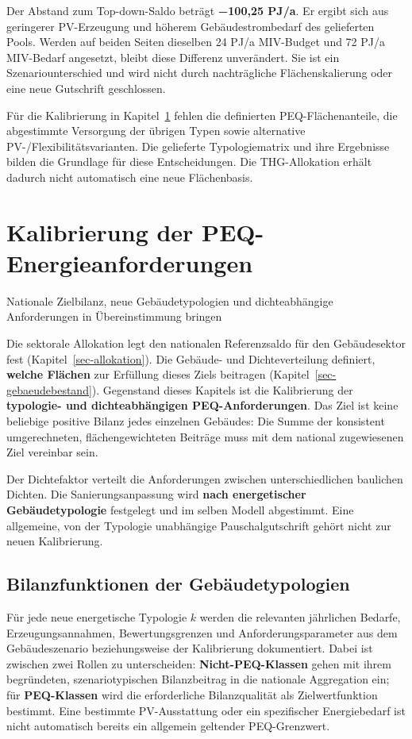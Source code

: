 \documentclass[
  ngerman,
  a4paper,
  DIV=11]{scrreprt}
\begin{document}
Der Abstand zum Top-down-Saldo beträgt \textbf{−100,25 PJ/a}. Er ergibt
sich aus geringerer PV-Erzeugung und höherem Gebäudestrombedarf des
gelieferten Pools. Werden auf beiden Seiten dieselben 24 PJ/a MIV-Budget
und 72 PJ/a MIV-Bedarf angesetzt, bleibt diese Differenz unverändert.
Sie ist ein Szenariounterschied und wird nicht durch nachträgliche
Flächenskalierung oder eine neue Gutschrift geschlossen.

Für die Kalibrierung in Kapitel~\ref{sec-kalibrierung} fehlen die
definierten PEQ-Flächenanteile, die abgestimmte Versorgung der übrigen
Typen sowie alternative PV-/Flexibilitätsvarianten. Die gelieferte
Typologiematrix und ihre Ergebnisse bilden die Grundlage für diese
Entscheidungen. Die THG-Allokation erhält dadurch nicht automatisch eine
neue Flächenbasis.

\chapter{Kalibrierung der
PEQ-Energieanforderungen}\label{sec-kalibrierung}

Nationale Zielbilanz, neue Gebäudetypologien und dichteabhängige
Anforderungen in Übereinstimmung bringen

Die sektorale Allokation legt den nationalen Referenzsaldo für den
Gebäudesektor fest (Kapitel~\ref{sec-allokation}). Die Gebäude- und
Dichteverteilung definiert, \textbf{welche Flächen} zur Erfüllung dieses
Ziels beitragen (Kapitel~\ref{sec-gebaeudebestand}). Gegenstand dieses
Kapitels ist die Kalibrierung der \textbf{typologie- und
dichteabhängigen PEQ-Anforderungen}. Das Ziel ist keine beliebige
positive Bilanz jedes einzelnen Gebäudes: Die Summe der konsistent
umgerechneten, flächengewichteten Beiträge muss mit dem national
zugewiesenen Ziel vereinbar sein.

Der Dichtefaktor verteilt die Anforderungen zwischen unterschiedlichen
baulichen Dichten. Die Sanierungsanpassung wird \textbf{nach
energetischer Gebäudetypologie} festgelegt und im selben Modell
abgestimmt. Eine allgemeine, von der Typologie unabhängige
Pauschalgutschrift gehört nicht zur neuen Kalibrierung.

\section{Bilanzfunktionen der
Gebäudetypologien}\label{sec-typologiesalden}

Für jede neue energetische Typologie \(k\) werden die relevanten
jährlichen Bedarfe, Erzeugungsannahmen, Bewertungsgrenzen und
Anforderungsparameter aus dem Gebäudeszenario beziehungsweise der
Kalibrierung dokumentiert. Dabei ist zwischen zwei Rollen zu
unterscheiden: \textbf{Nicht-PEQ-Klassen} gehen mit ihrem begründeten,
szenariotypischen Bilanzbeitrag in die nationale Aggregation ein; für
\textbf{PEQ-Klassen} wird die erforderliche Bilanzqualität als
Zielwertfunktion bestimmt. Eine bestimmte PV-Ausstattung oder ein
spezifischer Energiebedarf ist nicht automatisch bereits ein allgemein
geltender PEQ-Grenzwert.
\end{document}
